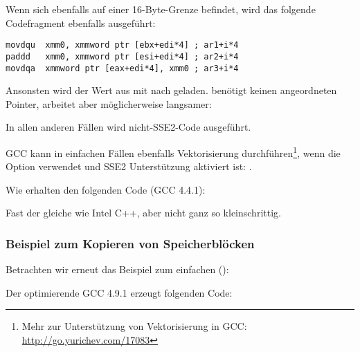 Wenn sich  ebenfalls auf einer 16-Byte-Grenze befindet, wird das folgende Codefragment ebenfalls ausgeführt:

\begin{lstlisting}[style=customasmx86]
movdqu  xmm0, xmmword ptr [ebx+edi*4] ; ar1+i*4
paddd   xmm0, xmmword ptr [esi+edi*4] ; ar2+i*4
movdqa  xmmword ptr [eax+edi*4], xmm0 ; ar3+i*4
\end{lstlisting}
Ansonsten wird der Wert aus  mit \MOVDQU nach  geladen. \MOVDQU benötigt keinen angeordneten Pointer,
arbeitet aber möglicherweise langsamer:



In allen anderen Fällen wird nicht-SSE2-Code ausgeführt.


\newcommand{\URLGCCVEC}{\url{http://go.yurichev.com/17083}}

GCC kann in einfachen Fällen ebenfalls Vektorisierung durchführen\footnote{Mehr zur Unterstützung von Vektorisierung in
GCC:
\URLGCCVEC}, wenn die Option \Othree verwendet und SSE2 Unterstützung aktiviert ist: .

Wie erhalten den folgenden Code (GCC 4.4.1):



Fast der gleiche wie Intel C++, aber nicht ganz so kleinschrittig.

\subsubsection{Beispiel zum Kopieren von Speicherblöcken}
\label{vec_memcpy}
Betrachten wir erneut das Beispiel zum einfachen ():



Der optimierende GCC 4.9.1 erzeugt folgenden Code:


